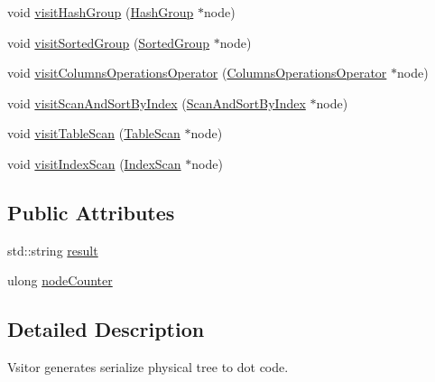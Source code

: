 \begin{DoxyCompactItemize}
\item 
void \hyperlink{class_physical_operator_drawing_visitor_a6841170440f377c240a7c0a7af179a29}{visit\+Hash\+Group} (\hyperlink{class_hash_group}{Hash\+Group} $\ast$node)
\item 
void \hyperlink{class_physical_operator_drawing_visitor_a1c7736861639025a85d54867d7eeafca}{visit\+Sorted\+Group} (\hyperlink{class_sorted_group}{Sorted\+Group} $\ast$node)
\item 
void \hyperlink{class_physical_operator_drawing_visitor_ad1fb3f6d50ba14ad674a71e5f6c35d12}{visit\+Columns\+Operations\+Operator} (\hyperlink{class_columns_operations_operator}{Columns\+Operations\+Operator} $\ast$node)
\item 
void \hyperlink{class_physical_operator_drawing_visitor_abf3323e213f5c7502e76b0d9afb9fe33}{visit\+Scan\+And\+Sort\+By\+Index} (\hyperlink{class_scan_and_sort_by_index}{Scan\+And\+Sort\+By\+Index} $\ast$node)
\item 
void \hyperlink{class_physical_operator_drawing_visitor_a709a44c2c02c9fc42d44fe3822c22f5b}{visit\+Table\+Scan} (\hyperlink{class_table_scan}{Table\+Scan} $\ast$node)
\item 
void \hyperlink{class_physical_operator_drawing_visitor_a3d8f7b6bff44d79fb741b2709587f867}{visit\+Index\+Scan} (\hyperlink{class_index_scan}{Index\+Scan} $\ast$node)
\end{DoxyCompactItemize}
\subsection*{Public Attributes}
\begin{DoxyCompactItemize}
\item 
std\+::string \hyperlink{class_physical_operator_drawing_visitor_a5663f7f6a5c8a6ad25d0c4c8f918123e}{result}
\item 
ulong \hyperlink{class_physical_operator_drawing_visitor_a75aa4987d070c40a3ec2e4e9c950c9e0}{node\+Counter}
\end{DoxyCompactItemize}


\subsection{Detailed Description}
Vsitor generates serialize physical tree to dot code. 


